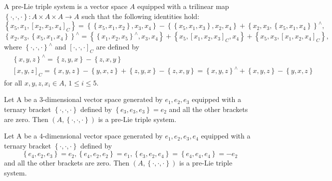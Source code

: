 \documentclass[11pt, twoside]{article}
\begin{document}
\begin{defi}[\cite{M21}]\label{d4.6}
    A pre-Lie triple system is a vector space $A$ equipped with a trilinear map $  \left\{ \cdot,\cdot,\cdot\right\}: A\times A\times A \to A $ such that the following identities hold: \begin{equation}\label{equ7}
        \left\{ x_5,x_1, [x_2,x_3,x_4 ]_C\right\}= \left\{\left\{ x_5,x_1,x_2\right\},x_3,x_4 \right\} -  \left\{\left\{ x_5,x_1,x_3\right\},x_2,x_4 \right\} + \left\{x_2,x_3,\left\{ x_5,x_1,x_4\right\}\right\}^{\wedge} ,
\end{equation}
\begin{equation}\label{equ8}
        \left\{x_2,x_3,\left\{ x_5,x_1,x_4\right\}\right\}^{\wedge}= \left\{\left\{ x_1,x_2,x_5\right\}^{\wedge},x_3,x_4 \right\} +\left\{ x_5, [x_1,x_2,x_3 ]_C,x_4\right\} +\left\{ x_5,x_3, [x_1,x_2,x_4 ]_C\right\} ,
    \end{equation} where $ \left\{ \cdot,\cdot,\cdot\right\}^{\wedge}$ and $[\cdot,\cdot,\cdot]_C $ are defined by \begin{align*}
        &\left\{ x,y,z\right\}^{\wedge}= \left\{ z,y,x\right\}- \left\{ z,x,y\right\} \\
& [x,y,z]_C= \left\{ x,y,z\right\} -\left\{y,x,z\right\}+\left\{z,y,x\right\}-\left\{ z,x,y\right\}= \left\{x,y,z\right\}^{\wedge} + \left\{x,y,z\right\}-\left\{ y,x,z\right\} 
    \end{align*} for all $x,y,z,x_i\in A$, $1\leq i\leq 5$.
\end{defi}

\begin{ex}[\cite{M21}]\label{ex4.7}
Let A be a $3$-dimensional vector space generated by $e_1,e_2,e_3  $ equipped with a ternary bracket $\left\{\cdot,\cdot,\cdot \right\} $ defined by $\left\{e_3,e_3,e_3 \right\}=e_2$ and all the other brackets are zero. Then $(A,\left\{\cdot,\cdot,\cdot \right\}) $ is a pre-Lie triple system. 
\end{ex}

\begin{ex}[\cite{M21}]
Let A be a $4$-dimensional vector space generated by $ e_1,e_2,e_3,e_4 $ equipped with a ternary bracket $\left\{\cdot,\cdot,\cdot \right\} $ defined by $$\left\{e_4,e_2,e_3 \right\}=e_2, \left\{e_4,e_2,e_2 \right\}=e_1, \left\{e_3,e_2,e_4 \right\}=\left\{e_4,e_4,e_4 \right\}= -e_2$$ and all the other brackets are zero. Then $(A,\left\{\cdot,\cdot,\cdot \right\}) $ is a pre-Lie triple system.
\end{ex}
\end{document}
